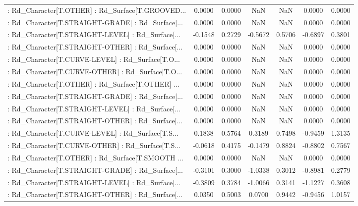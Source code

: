 \begin{longtable}{p{4cm}cccccc}
 : Rd\_Character[T.OTHER] : Rd\_Surface[T.GROOVED... &  0.0000 &    0.0000 &     NaN &          NaN &  0.0000 &  0.0000 \\
 : Rd\_Character[T.STRAIGHT-GRADE] : Rd\_Surface[... &  0.0000 &    0.0000 &     NaN &          NaN &  0.0000 &  0.0000 \\
 : Rd\_Character[T.STRAIGHT-LEVEL] : Rd\_Surface[... & -0.1548 &    0.2729 & -0.5672 &       0.5706 & -0.6897 &  0.3801 \\
 : Rd\_Character[T.STRAIGHT-OTHER] : Rd\_Surface[... &  0.0000 &    0.0000 &     NaN &          NaN &  0.0000 &  0.0000 \\
 : Rd\_Character[T.CURVE-LEVEL] : Rd\_Surface[T.O... &  0.0000 &    0.0000 &     NaN &          NaN &  0.0000 &  0.0000 \\
 : Rd\_Character[T.CURVE-OTHER] : Rd\_Surface[T.O... &  0.0000 &    0.0000 &     NaN &          NaN &  0.0000 &  0.0000 \\
 : Rd\_Character[T.OTHER] : Rd\_Surface[T.OTHER] ... &  0.0000 &    0.0000 &     NaN &          NaN &  0.0000 &  0.0000 \\
 : Rd\_Character[T.STRAIGHT-GRADE] : Rd\_Surface[... &  0.0000 &    0.0000 &     NaN &          NaN &  0.0000 &  0.0000 \\
 : Rd\_Character[T.STRAIGHT-LEVEL] : Rd\_Surface[... &  0.0000 &    0.0000 &     NaN &          NaN &  0.0000 &  0.0000 \\
 : Rd\_Character[T.STRAIGHT-OTHER] : Rd\_Surface[... &  0.0000 &    0.0000 &     NaN &          NaN &  0.0000 &  0.0000 \\
 : Rd\_Character[T.CURVE-LEVEL] : Rd\_Surface[T.S... &  0.1838 &    0.5764 &  0.3189 &       0.7498 & -0.9459 &  1.3135 \\
 : Rd\_Character[T.CURVE-OTHER] : Rd\_Surface[T.S... & -0.0618 &    0.4175 & -0.1479 &       0.8824 & -0.8802 &  0.7567 \\
 : Rd\_Character[T.OTHER] : Rd\_Surface[T.SMOOTH ... &  0.0000 &    0.0000 &     NaN &          NaN &  0.0000 &  0.0000 \\
 : Rd\_Character[T.STRAIGHT-GRADE] : Rd\_Surface[... & -0.3101 &    0.3000 & -1.0338 &       0.3012 & -0.8981 &  0.2779 \\
 : Rd\_Character[T.STRAIGHT-LEVEL] : Rd\_Surface[... & -0.3809 &    0.3784 & -1.0066 &       0.3141 & -1.1227 &  0.3608 \\
 : Rd\_Character[T.STRAIGHT-OTHER] : Rd\_Surface[... &  0.0350 &    0.5003 &  0.0700 &       0.9442 & -0.9456 &  1.0157 \\

\end{longtable}
